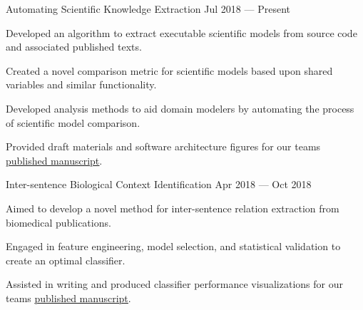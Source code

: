 
\vspace{-0.2cm}

\begin{cventries}


  \cventry
    {} %
    {Automating Scientific Knowledge Extraction} %
    {Jul 2018 --- Present} %
    {} %
    {
      \vspace{-0.5cm}
      \begin{cvitems} %
        \item Developed an algorithm to extract executable scientific models from source code and associated published texts.
        \item Created a novel comparison metric for scientific models based upon shared variables and similar functionality.
        \item Developed analysis methods to aid domain modelers by automating the process of scientific model comparison.
        \item Provided draft materials and software architecture figures for our teams \href{https://arxiv.org/abs/2001.07295}{\underline{published manuscript}}.
      \end{cvitems}
    }

  \cventry
    {} %
    {Inter-sentence Biological Context Identification} %
    {Apr 2018 --- Oct 2018} %
    {} %
    {
      \vspace{-0.5cm}
      \begin{cvitems} %
        \item Aimed to develop a novel method for inter-sentence relation extraction from biomedical publications.
        \item Engaged in feature engineering, model selection, and statistical validation to create an optimal classifier.
        \item Assisted in writing and produced classifier performance visualizations for our teams \href{https://arxiv.org/abs/1812.06199}{\underline{published manuscript}}.
      \end{cvitems}
    }


\end{cventries}
